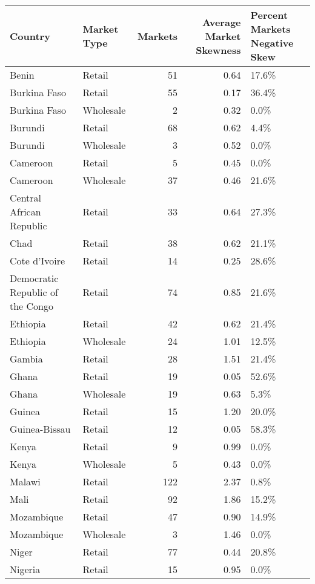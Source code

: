 \begin{table}[ht]
\centering
\begin{tabular}{llrrl}
  \hline
Country & Market Type & Markets & Average Market Skewness  & Percent Markets Negative Skew \\ 
  \hline
Benin & Retail &  51 & 0.64 & 17.6\% \\ 
  Burkina Faso & Retail &  55 & 0.17 & 36.4\% \\ 
  Burkina Faso & Wholesale &   2 & 0.32 & 0.0\% \\ 
  Burundi & Retail &  68 & 0.62 & 4.4\% \\ 
  Burundi & Wholesale &   3 & 0.52 & 0.0\% \\ 
  Cameroon & Retail &   5 & 0.45 & 0.0\% \\ 
  Cameroon & Wholesale &  37 & 0.46 & 21.6\% \\ 
  Central African Republic & Retail &  33 & 0.64 & 27.3\% \\ 
  Chad & Retail &  38 & 0.62 & 21.1\% \\ 
  Cote d'Ivoire & Retail &  14 & 0.25 & 28.6\% \\ 
  Democratic Republic of the Congo & Retail &  74 & 0.85 & 21.6\% \\ 
  Ethiopia & Retail &  42 & 0.62 & 21.4\% \\ 
  Ethiopia & Wholesale &  24 & 1.01 & 12.5\% \\ 
  Gambia & Retail &  28 & 1.51 & 21.4\% \\ 
  Ghana & Retail &  19 & 0.05 & 52.6\% \\ 
  Ghana & Wholesale &  19 & 0.63 & 5.3\% \\ 
  Guinea & Retail &  15 & 1.20 & 20.0\% \\ 
  Guinea-Bissau & Retail &  12 & 0.05 & 58.3\% \\ 
  Kenya & Retail &   9 & 0.99 & 0.0\% \\ 
  Kenya & Wholesale &   5 & 0.43 & 0.0\% \\ 
  Malawi & Retail & 122 & 2.37 & 0.8\% \\ 
  Mali & Retail &  92 & 1.86 & 15.2\% \\ 
  Mozambique & Retail &  47 & 0.90 & 14.9\% \\ 
  Mozambique & Wholesale &   3 & 1.46 & 0.0\% \\ 
  Niger & Retail &  77 & 0.44 & 20.8\% \\ 
  Nigeria & Retail &  15 & 0.95 & 0.0\% \\ 

\end{tabular}
\end{table}
